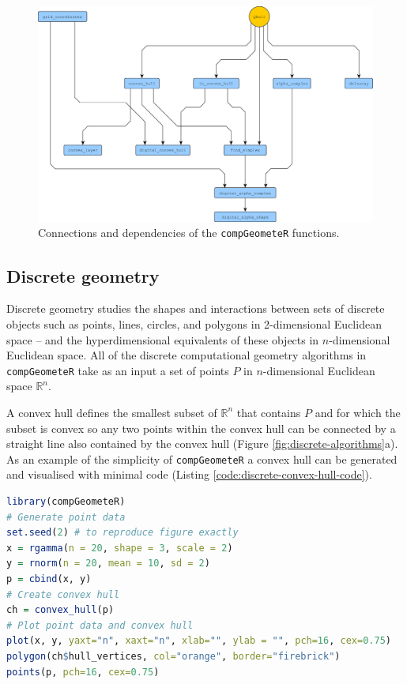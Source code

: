 \documentclass[12pt, a4paper]{article}
\begin{document}
\begin{figure}[ht]
\centering
\includegraphics[width=15cm]{figures/software-structure/software-structure.png}
\caption{Connections and dependencies of the \texttt{compGeometeR} functions.}
\label{fig:software-structure}
\end{figure}

\subsection{Discrete geometry}

Discrete geometry studies the shapes and interactions between sets of discrete objects such as points, lines, circles, and polygons in 2-dimensional Euclidean space -- and the hyperdimensional equivalents of these objects in $n$-dimensional Euclidean space.  All of the discrete computational geometry algorithms in \texttt{compGeometeR} take as an input a set of points $P$ in $n$-dimensional Euclidean space $\mathbb{R}^n$.

A convex hull \citep{barber-1996} defines the smallest subset of $\mathbb{R}^n$ that contains $P$ and for which the subset is convex so any two points within the convex hull can be connected by a straight line also contained by the convex hull (Figure \ref{fig:discrete-algorithms}a).  As an example of the simplicity of \texttt{compGeometeR} a convex hull can be generated and visualised with minimal code (Listing \ref{code:discrete-convex-hull-code}).

\begin{lstlisting}[language=R, caption=Example \texttt{R} code to create a discrete convex hull with \texttt{compGeometeR}, label={code:discrete-convex-hull-code}]
library(compGeometeR)
# Generate point data
set.seed(2) # to reproduce figure exactly
x = rgamma(n = 20, shape = 3, scale = 2)
y = rnorm(n = 20, mean = 10, sd = 2)
p = cbind(x, y)
# Create convex hull
ch = convex_hull(p)
# Plot point data and convex hull
plot(x, y, yaxt="n", xaxt="n", xlab="", ylab = "", pch=16, cex=0.75)
polygon(ch$hull_vertices, col="orange", border="firebrick")
points(p, pch=16, cex=0.75)
\end{lstlisting}
\end{document}
